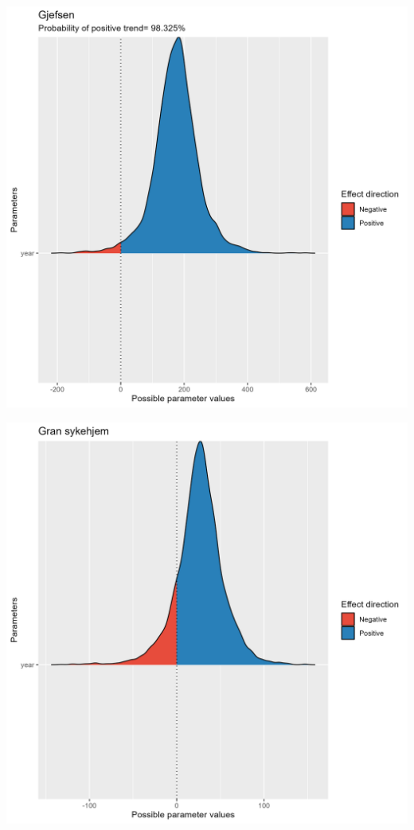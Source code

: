 \documentclass[
  letterpaper,
  DIV=11,
  numbers=noendperiod]{scrreport}
\begin{document}
\includegraphics{data/derived_data/direction_plots/plots/Gjefsen.png}

\includegraphics{data/derived_data/direction_plots/plots/Gran_sykehjem.png}
\end{document}
